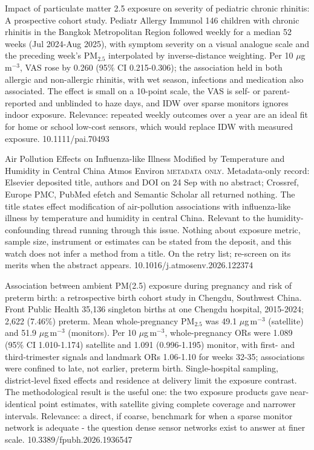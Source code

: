 \documentclass[10pt]{article}
\begin{document}

{Impact of particulate matter 2.5 exposure on severity of pediatric chronic rhinitis: A prospective cohort study.}
{Pediatr Allergy Immunol}
{146 children with chronic rhinitis in the Bangkok Metropolitan Region followed weekly for a median 52 weeks (Jul 2024-Aug 2025), with symptom severity on a visual analogue scale and the preceding week's PM$_{2.5}$ interpolated by inverse-distance weighting. Per 10 $\mu$g\,m$^{-3}$, VAS rose by 0.260 (95\% CI 0.215-0.306); the association held in both allergic and non-allergic rhinitis, with wet season, infections and medication also associated. The effect is small on a 10-point scale, the VAS is self- or parent-reported and unblinded to haze days, and IDW over sparse monitors ignores indoor exposure. Relevance: repeated weekly outcomes over a year are an ideal fit for home or school low-cost sensors, which would replace IDW with measured exposure.}
{10.1111/pai.70493}

{Air Pollution Effects on Influenza-like Illness Modified by Temperature and Humidity in Central China}
{Atmos Environ}
{\textsc{metadata only.} Metadata-only record: Elsevier deposited title, authors and DOI on 24 Sep with no abstract; Crossref, Europe PMC, PubMed efetch and Semantic Scholar all returned nothing. The title states effect modification of air-pollution associations with influenza-like illness by temperature and humidity in central China. Relevant to the humidity-confounding thread running through this issue. Nothing about exposure metric, sample size, instrument or estimates can be stated from the deposit, and this watch does not infer a method from a title. On the retry list; re-screen on its merits when the abstract appears.}
{10.1016/j.atmosenv.2026.122374}


{Association between ambient PM(2.5) exposure during pregnancy and risk of preterm birth: a retrospective birth cohort study in Chengdu, Southwest China.}
{Front Public Health}
{35,136 singleton births at one Chengdu hospital, 2015-2024; 2,622 (7.46\%) preterm. Mean whole-pregnancy PM$_{2.5}$ was 49.1 $\mu$g\,m$^{-3}$ (satellite) and 51.9 $\mu$g\,m$^{-3}$ (monitors). Per 10 $\mu$g\,m$^{-3}$, whole-pregnancy ORs were 1.089 (95\% CI 1.010-1.174) satellite and 1.091 (0.996-1.195) monitor, with first- and third-trimester signals and landmark ORs 1.06-1.10 for weeks 32-35; associations were confined to late, not earlier, preterm birth. Single-hospital sampling, district-level fixed effects and residence at delivery limit the exposure contrast. The methodological result is the useful one: the two exposure products gave near-identical point estimates, with satellite giving complete coverage and narrower intervals. Relevance: a direct, if coarse, benchmark for when a sparse monitor network is adequate - the question dense sensor networks exist to answer at finer scale.}
{10.3389/fpubh.2026.1936547}
\end{document}
